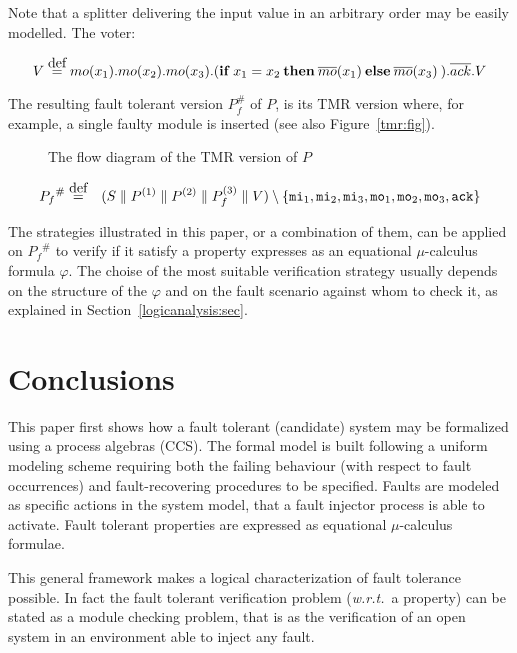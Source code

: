 \documentclass{entcs}
\newcommand{\wrt}{\emph{w.r.t.~}}
\newcommand{\faultt}[1]{{#1}^{\#}}
\newcommand{\eqdef}{\stackrel{\mbox{{\tiny def}}}{=}}
\newcommand{\inp}[1]{{#1}}
\newcommand{\out}[1]{\overline{#1}}
\newcommand{\ccsif}[3]
{\mathbf{if}\: #1 \: \mathbf{then}\: #2 \: \mathbf{else}\:
#3 \:}
\begin{document}
Note that a splitter delivering the input value in an arbitrary
order may be easily modelled. The voter:%

$$
V  \eqdef \inp{mo}(x_1). \inp{mo}(x_2).\inp{mo}(x_3).
(\ccsif{x_1 = x_2}{\out{mo}(x_1)}{\out{mo}(x_3)}).\out{ack}.V
$$%

The resulting fault tolerant version $P^{\#}_f$ of $P$, is its TMR
version where, for example, a single faulty module is inserted (see
also Figure~\ref{tmr:fig}).

\begin{figure}[t]
\centerline{}
\caption{The flow diagram of the TMR version of $P$}
\protect{\label{tmr:fig}}
\end{figure}

\begin{eqnarray*}
\faultt{P_f} & \eqdef & (S \parallel P^{(1)} \parallel P^{(2)}
\parallel P^{(3)}_f \parallel V)
\setminus \{
            {\tt mi}_1,{\tt mi}_2, {\tt mi}_3, {\tt mo}_1,{\tt mo}_2,
            {\tt mo}_3, {\tt ack} \}
\end{eqnarray*}

The strategies illustrated in this paper, or a combination of them,
can be applied on $\faultt{P_f}$ to verify if it satisfy a property
expresses as an equational $\mu$-calculus formula $\varphi$. The
choise of the most suitable verification strategy usually depends on
the structure of the $\varphi$ and on the fault scenario against whom
to check it, as explained in Section~\ref{logicanalysis:sec}.


\section{Conclusions}
This paper first shows how a fault tolerant (candidate) system may be
formalized using a process algebras (CCS).  The formal model is built
following a uniform modeling scheme requiring both the failing
behaviour (with respect to fault occurrences) and fault-recovering
procedures to be specified.  Faults are modeled as specific actions in
the system model, that a fault injector process is able to activate.
Fault tolerant properties are expressed as equational $\mu$-calculus
formulae.

This general framework makes a logical characterization of fault
tolerance possible. In fact the fault tolerant verification problem
(\wrt a property) can be stated as a module checking problem, that is
as the verification of an open system in an environment able to inject
any fault.
\end{document}
